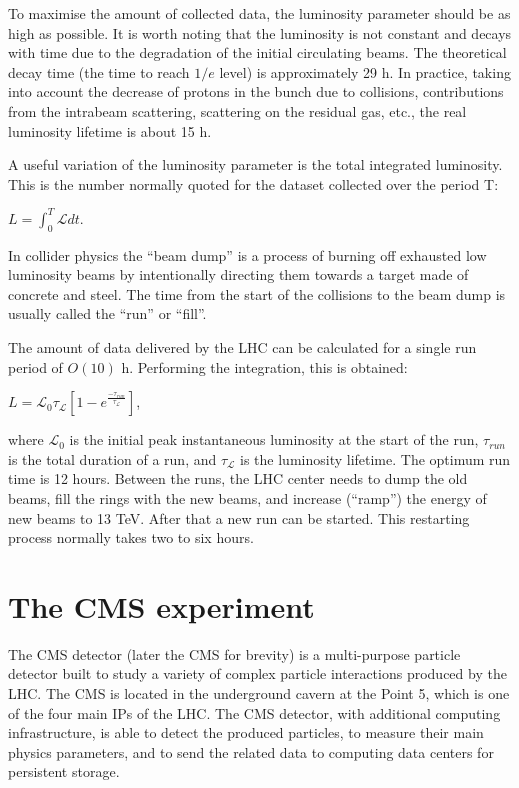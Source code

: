 \begin{normalsize}
To maximise the amount of collected data, the luminosity parameter should be as high as possible. It is worth noting that the luminosity is not constant and decays with time due to the degradation of the initial circulating beams. The theoretical decay time (the time to reach $1/e$ level) is approximately 29 h. In practice, taking into account the decrease of protons in the bunch due to collisions, contributions from the intrabeam scattering, scattering on the residual gas, etc., the real luminosity lifetime is about 15 h. 

A useful variation of the luminosity parameter is the total integrated luminosity. This is the number normally quoted for the dataset collected over the period T:

$L = \int_{0}^{T} \mathcal{L}  dt$.

In collider physics the ``beam dump'' is a process of burning off exhausted low luminosity beams by intentionally directing them towards a target made of concrete and steel. The time from the start of the collisions to the beam dump is usually called the ``run'' or ``fill''.

The amount of data delivered by the LHC can be calculated for a single run period of $O(10)$ h. Performing the integration, this is obtained: 

 $L = \mathcal{L}_0 \tau_\mathcal{L}  \left[  1- e^{\frac{-\tau_{run}}{\tau_\mathcal{L} }}  \right]$, 

\noindent where $\mathcal{L}_0$ is the initial peak instantaneous luminosity at the start of the run, $\tau_{run}$ is the total duration of a run, and $\tau_\mathcal{L}$ is the luminosity lifetime. The optimum run time is 12 hours. Between the runs, the LHC center needs to dump the old beams, fill the rings with the new beams, and increase (``ramp'') the energy of new beams to 13 TeV. After that a new run can be started. This restarting process normally takes two to six hours.





\section{The CMS experiment}

The CMS detector (later the CMS for brevity) is a multi-purpose particle detector built to study a variety of complex particle interactions produced by the LHC. The CMS is located in the underground cavern at the Point 5, which is one of the four main IPs of the LHC. The CMS detector, with additional computing infrastructure, is able to detect the produced particles, to measure their main physics parameters, and to send the related data to computing data centers for persistent storage. 



\end{normalsize}
